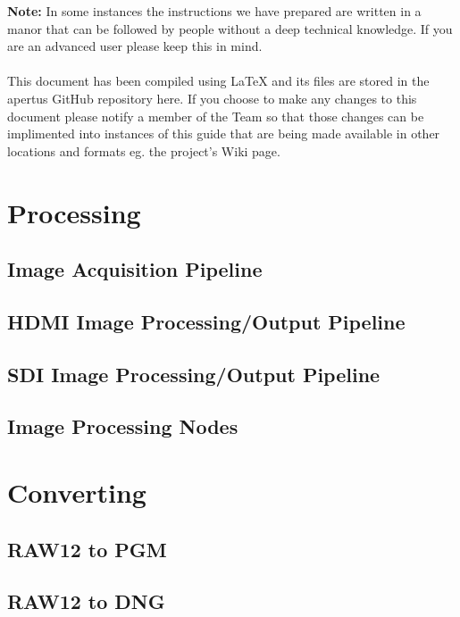 \documentclass{article}
\begin{document}
\tableofcontents

\vspace*{\fill}
\textbf{Note:} In some instances the instructions we have prepared are written in a manor that can be followed by people without a deep technical knowledge. If you are an advanced user please keep this in mind.\\
\\This document has been compiled using LaTeX and its files are stored in the apertus GitHub repository here. If you choose to make any changes to this document please notify a member of the Team so that those changes can be implimented into instances of this guide that are being made available in other locations and formats eg. the project's Wiki page.

\newpage









\section{Processing}
\subsection{Image Acquisition Pipeline}
\subsection{HDMI Image Processing/Output Pipeline}
\subsection{SDI Image Processing/Output Pipeline}
\subsection{Image Processing Nodes}

\section{Converting}
\subsection{RAW12 to PGM}
\subsection{RAW12 to DNG}
\end{document}
